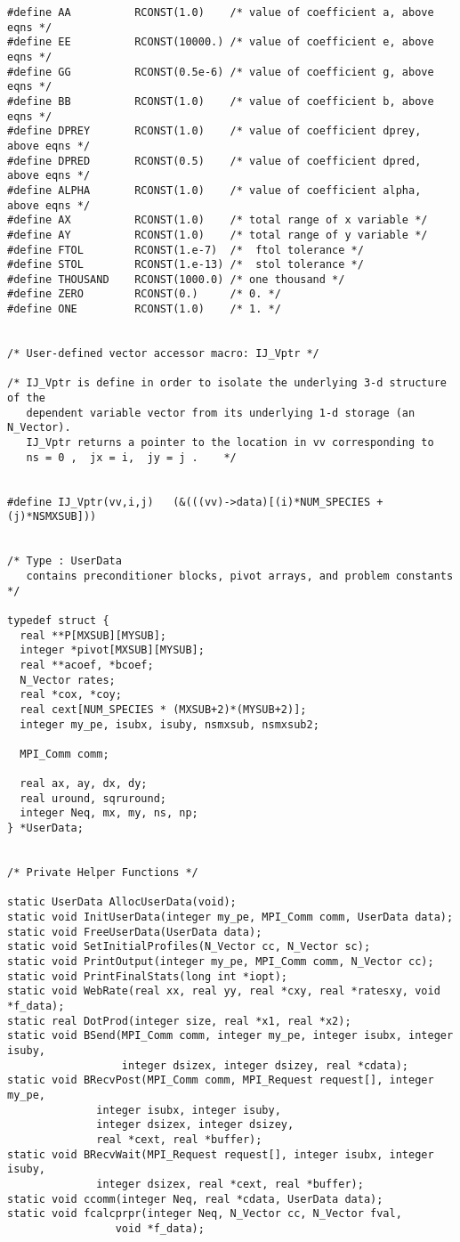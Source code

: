 \begin{verbatim}
#define AA          RCONST(1.0)    /* value of coefficient a, above eqns */
#define EE          RCONST(10000.) /* value of coefficient e, above eqns */
#define GG          RCONST(0.5e-6) /* value of coefficient g, above eqns */
#define BB          RCONST(1.0)    /* value of coefficient b, above eqns */
#define DPREY       RCONST(1.0)    /* value of coefficient dprey, above eqns */
#define DPRED       RCONST(0.5)    /* value of coefficient dpred, above eqns */
#define ALPHA       RCONST(1.0)    /* value of coefficient alpha, above eqns */
#define AX          RCONST(1.0)    /* total range of x variable */
#define AY          RCONST(1.0)    /* total range of y variable */
#define FTOL        RCONST(1.e-7)  /*  ftol tolerance */
#define STOL        RCONST(1.e-13) /*  stol tolerance */
#define THOUSAND    RCONST(1000.0) /* one thousand */
#define ZERO        RCONST(0.)     /* 0. */
#define ONE         RCONST(1.0)    /* 1. */


/* User-defined vector accessor macro: IJ_Vptr */

/* IJ_Vptr is define in order to isolate the underlying 3-d structure of the 
   dependent variable vector from its underlying 1-d storage (an N_Vector).
   IJ_Vptr returns a pointer to the location in vv corresponding to 
   ns = 0 ,  jx = i,  jy = j .    */


#define IJ_Vptr(vv,i,j)   (&(((vv)->data)[(i)*NUM_SPECIES + (j)*NSMXSUB]))


/* Type : UserData 
   contains preconditioner blocks, pivot arrays, and problem constants */

typedef struct {
  real **P[MXSUB][MYSUB];
  integer *pivot[MXSUB][MYSUB];
  real **acoef, *bcoef;
  N_Vector rates;
  real *cox, *coy;
  real cext[NUM_SPECIES * (MXSUB+2)*(MYSUB+2)];
  integer my_pe, isubx, isuby, nsmxsub, nsmxsub2;

  MPI_Comm comm;
  
  real ax, ay, dx, dy;
  real uround, sqruround;
  integer Neq, mx, my, ns, np;
} *UserData;


/* Private Helper Functions */

static UserData AllocUserData(void);
static void InitUserData(integer my_pe, MPI_Comm comm, UserData data);
static void FreeUserData(UserData data);
static void SetInitialProfiles(N_Vector cc, N_Vector sc);
static void PrintOutput(integer my_pe, MPI_Comm comm, N_Vector cc);
static void PrintFinalStats(long int *iopt);
static void WebRate(real xx, real yy, real *cxy, real *ratesxy, void *f_data);
static real DotProd(integer size, real *x1, real *x2);
static void BSend(MPI_Comm comm, integer my_pe, integer isubx, integer isuby,
                  integer dsizex, integer dsizey, real *cdata);
static void BRecvPost(MPI_Comm comm, MPI_Request request[], integer my_pe,
		      integer isubx, integer isuby,
		      integer dsizex, integer dsizey,
		      real *cext, real *buffer);
static void BRecvWait(MPI_Request request[], integer isubx, integer isuby,
		      integer dsizex, real *cext, real *buffer);
static void ccomm(integer Neq, real *cdata, UserData data);
static void fcalcprpr(integer Neq, N_Vector cc, N_Vector fval, 
	             void *f_data);





\end{verbatim}
